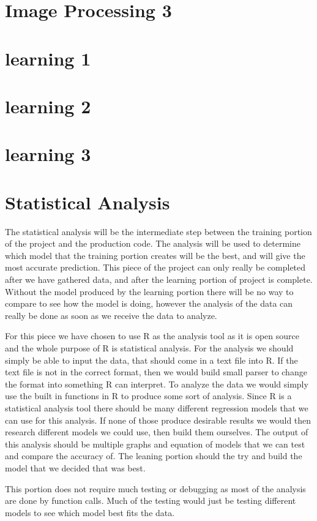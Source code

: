 \documentclass[onecolumn, draftclsnofoot,10pt, compsoc]{IEEEtran}
\begin{document}
\section{Image Processing 3}
\section{learning 1}
\section{learning 2}
\section{learning 3}
\section{Statistical Analysis}
The statistical analysis will be the intermediate step between the training portion of the project and the production code. The analysis will be used to determine which model that the training portion creates will be the best, and will give the most accurate prediction. This piece of the project can only really be completed after we have gathered data, and after the learning portion of project is complete. Without the model produced by the learning portion there will be no way to compare to see how the model is doing, however the analysis of the data can really be done as soon as we receive the data to analyze.

For this piece we have chosen to use R as the analysis tool as it is open source and the whole purpose of R is statistical analysis. For the analysis we should simply be able to input the data, that should come in a text file into R. If the text file is not in the correct format, then we would build small parser to change the format into something R can interpret. To analyze the data we would simply use the built in functions in R to produce some sort of analysis. Since R is a statistical analysis tool there should be many different regression models that we can use for this analysis. If none of those produce desirable results we would then research different models we could use, then build them ourselves. The output of this analysis should be multiple graphs and equation of models that we can test and compare the accuracy of. The leaning portion should the try and build the model that we decided that was best.

This portion does not require much testing or debugging as most of the analysis are done by function calls. Much of the testing would just be testing different models to see which model best fits the data.
\end{document}

